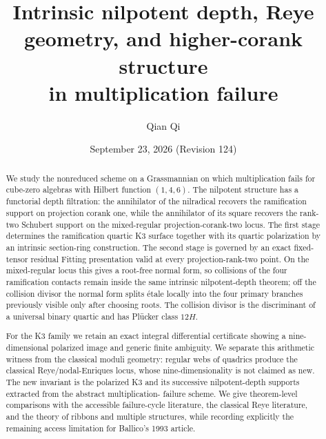 \title[Intrinsic nilpotent depth and multiplication failure]{Intrinsic nilpotent depth, Reye geometry, and higher-corank structure\texorpdfstring{\\}{}in multiplication failure}
\author{Qian Qi}
\date{September 23, 2026 \quad (Revision 124)}
\begin{abstract}
We study the nonreduced scheme on a Grassmannian on which multiplication
fails for cube-zero algebras with Hilbert function $(1,4,6)$.  The
nilpotent structure has a functorial depth filtration: the annihilator
of the nilradical recovers the ramification support on projection
corank one, while the annihilator of its square recovers the rank-two
Schubert support on the mixed-regular projection-corank-two locus.
The first stage determines the ramification quartic K3 surface together
with its quartic polarization by an intrinsic section-ring construction.
The second stage is governed by an exact fixed-tensor residual Fitting
presentation valid at every projection-rank-two point.  On the
mixed-regular locus this gives a root-free normal form, so collisions
of the four ramification contacts remain inside the same intrinsic
nilpotent-depth theorem; off the collision divisor the normal form
splits \'etale locally into the four primary branches previously visible
only after choosing roots.  The collision divisor is the discriminant
of a universal binary quartic and has Pl\"ucker class $12H$.

For the K3 family we retain an exact integral differential certificate
showing a nine-dimensional polarized image and generic finite
ambiguity.  We separate this arithmetic witness from the classical
moduli geometry: regular webs of quadrics produce the classical
Reye/nodal-Enriques locus, whose nine-dimensionality is not claimed
as new.  The new invariant is the polarized K3 and its successive
nilpotent-depth supports extracted from the abstract multiplication-
failure scheme.  We give theorem-level comparisons with the accessible
failure-cycle literature, the classical Reye literature, and the
theory of ribbons and multiple structures, while recording explicitly
the remaining access limitation for Ballico's 1993 article.
\end{abstract}
\maketitle
